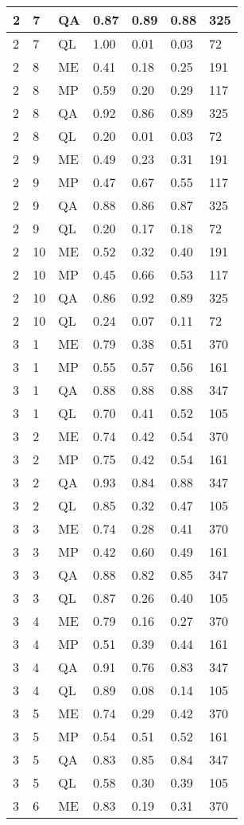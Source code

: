 \begin{table}[!ht]
\begin{tabularx}{300pt}{|X|X|X|X|X|X|X|}
\hline
2&7&QA&0.87&0.89&0.88&325\\
\hline
2&7&QL&1.00&0.01&0.03&72\\
\hline
2&8&ME&0.41&0.18&0.25&191\\
\hline
2&8&MP&0.59&0.20&0.29&117\\
\hline
2&8&QA&0.92&0.86&0.89&325\\
\hline
2&8&QL&0.20&0.01&0.03&72\\
\hline
2&9&ME&0.49&0.23&0.31&191\\
\hline
2&9&MP&0.47&0.67&0.55&117\\
\hline
2&9&QA&0.88&0.86&0.87&325\\
\hline
2&9&QL&0.20&0.17&0.18&72\\
\hline
2&10&ME&0.52&0.32&0.40&191\\
\hline
2&10&MP&0.45&0.66&0.53&117\\
\hline
2&10&QA&0.86&0.92&0.89&325\\
\hline
2&10&QL&0.24&0.07&0.11&72\\
\hline
3&1&ME&0.79&0.38&0.51&370\\
\hline
3&1&MP&0.55&0.57&0.56&161\\
\hline
3&1&QA&0.88&0.88&0.88&347\\
\hline
3&1&QL&0.70&0.41&0.52&105\\
\hline
3&2&ME&0.74&0.42&0.54&370\\
\hline
3&2&MP&0.75&0.42&0.54&161\\
\hline
3&2&QA&0.93&0.84&0.88&347\\
\hline
3&2&QL&0.85&0.32&0.47&105\\
\hline
3&3&ME&0.74&0.28&0.41&370\\
\hline
3&3&MP&0.42&0.60&0.49&161\\
\hline
3&3&QA&0.88&0.82&0.85&347\\
\hline
3&3&QL&0.87&0.26&0.40&105\\
\hline
3&4&ME&0.79&0.16&0.27&370\\
\hline
3&4&MP&0.51&0.39&0.44&161\\
\hline
3&4&QA&0.91&0.76&0.83&347\\
\hline
3&4&QL&0.89&0.08&0.14&105\\
\hline
3&5&ME&0.74&0.29&0.42&370\\
\hline
3&5&MP&0.54&0.51&0.52&161\\
\hline
3&5&QA&0.83&0.85&0.84&347\\
\hline
3&5&QL&0.58&0.30&0.39&105\\
\hline
3&6&ME&0.83&0.19&0.31&370\\

\end{tabularx}
\end{table}
